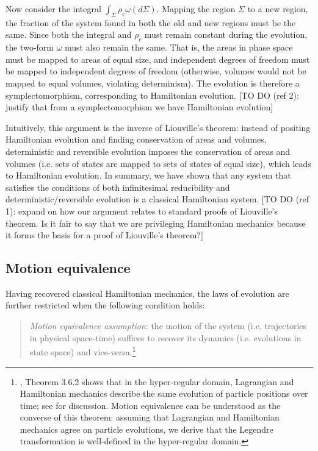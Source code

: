\documentclass[12pt, english, twoside]{article} %
\newcommand\bs{\begin{singlespace}}
\newcommand\es{\end{singlespace}}
\begin{document}

Now consider the integral $\int_{\Sigma} \rho_c \omega(d\Sigma)$. Mapping the region $\Sigma$ to a new region, the fraction of the system found in both the old and new regions must be the same. Since both the integral and $\rho_c$ must remain constant during the evolution, the two-form $\omega$ must also remain the same. That is, the areas in phase space must be mapped to areas of equal size, and independent degrees of freedom must be mapped to independent degrees of freedom (otherwise, volumes would not be mapped to equal volumes, violating determinism). The evolution is therefore a symplectomorphism, corresponding to Hamiltonian evolution. [TO DO (ref 2): justify that from a symplectomorphism we have Hamiltonian evolution]

Intuitively, this argument is the inverse of Liouville's theorem: instead of positing Hamiltonian evolution and finding conservation of areas and volumes, deterministic and reversible evolution imposes the conservation of areas and volumes (i.e. sets of states are mapped to sets of states of equal size), which leads to Hamiltonian evolution. In summary, we have shown that any system that satisfies the conditions of both infinitesimal reducibility and deterministic/reversible evolution is a classical Hamiltonian system. [TO DO (ref 1): expand on how our argument relates to standard proofs of Liouville's theorem. Is it fair to say that we are privileging Hamiltonian mechanics because it forms the basis for a proof of Liouville's theorem?]


\subsection{Motion equivalence}
\label{motion}

Having recovered classical Hamiltonian mechanics, the laws of evolution are further restricted when the following condition holds:


\begin{quotation}
\bs \noindent
\textit{Motion equivalence assumption}: the motion of the system (i.e. trajectories in physical space-time) suffices to recover its dynamics (i.e. evolutions in state space) and vice-versa.\footnote{ \textcites[218]{Abraham}, Theorem 3.6.2 shows that in the hyper-regular domain, Lagrangian and Hamiltonian mechanics describe the same evolution of particle positions over time; see \textcites[1180-1181]{Barrett2} for discussion. Motion equivalence can be understood as the converse of this theorem: assuming that Lagrangian and Hamiltonian mechanics agree on particle evolutions, we derive that the Legendre transformation is well-defined in the hyper-regular domain.} \es
\end{quotation}
\end{document}
